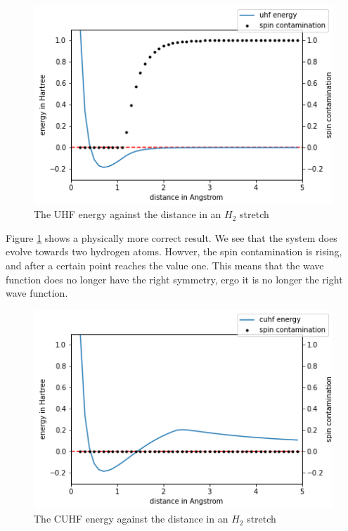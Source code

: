 \documentclass[twoside,twocolumn,9pt]{article}
\begin{document}
\begin{center}
\begin{figure}[h]
  \includegraphics[width=\linewidth]{./../notes/figures/uhf.png}
  \caption{The UHF energy against the distance in an $H_2$ stretch}
  \label{fig:uhfstretch}
\end{figure}
\end{center}
Figure \ref{fig:uhfstretch} shows a physically more correct result. We see that the system does evolve towards two hydrogen atoms. Howver, the spin contamination is rising, and after a certain point reaches the value one. This means that the wave function does no longer have the right symmetry, ergo it is no longer the right wave function.
\begin{center}
\begin{figure}[h]
  \includegraphics[width=\linewidth]{./../notes/figures/cuhf_mix.png}
  \caption{The CUHF energy against the distance in an $H_2$ stretch}
  \label{fig:cuhfstretch}
\end{figure}
\end{center}
\end{document}
